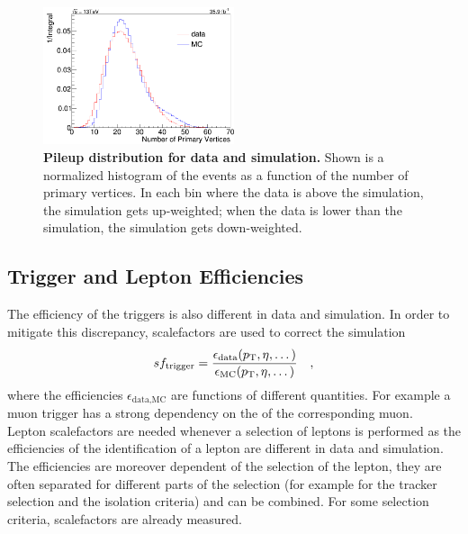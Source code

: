\begin{figure}
\centering
\includegraphics[width=0.5\textwidth]{chapter_3_gen/pup.png}
\caption[Pileup Distributions for Data and Simulation]{\textbf{Pileup distribution for data and simulation.} Shown is a normalized histogram of the events as a function of the number of primary vertices. In each bin where the data is above the simulation, the simulation gets up-weighted; when the data is lower than the simulation, the simulation gets down-weighted.}
\label{fig:ch_3_pup}
\end{figure}

\subsection{Trigger and Lepton Efficiencies}
The efficiency of the triggers is also different in data and simulation. In order to mitigate this discrepancy, scalefactors are used to correct the simulation
\begin{equation}
sf_\textrm{trigger} = \frac{\epsilon_\textrm{data}(p_\mathrm{T},\eta,\dots)}{\epsilon_\textrm{MC}(p_\mathrm{T},\eta,\dots)} \quad ,
\end{equation}
where the efficiencies $\epsilon_\textrm{data,MC}$ are functions of different quantities. For example a muon trigger has a strong dependency on the \pt of the corresponding muon. \\

Lepton scalefactors are needed whenever a selection of leptons is performed as the efficiencies of the identification of a lepton are different in data and simulation. The efficiencies are moreover dependent of the selection of the lepton, they are often separated for different parts of the selection (for example for the tracker selection and the isolation criteria) and can be combined. For some selection criteria, scalefactors are already measured.




